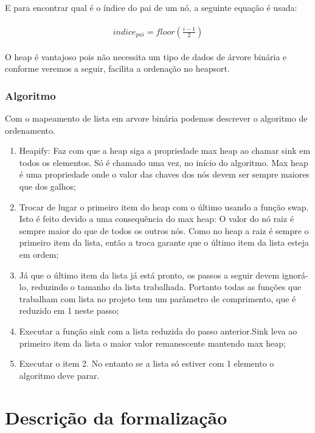 E para encontrar qual é o índice do pai de um nó, a seguinte equação é usada:

\begin{gather}
\begin{align}
indice_{pai} = floor(\frac{i-1}{2})
\end{align}
\end{gather}

O heap é vantajoso pois não necessita um tipo de dados de árvore binária e conforme veremos a seguir, facilita a ordenação no heapsort.
    
\subsection{Algoritmo}

Com o mapeamento de lista em arvore binária podemos descrever o algoritmo de ordenamento.

\begin{enumerate}
    \item Heapify: Faz com que a heap siga a propriedade max heap ao chamar sink em todos os elementos. Só é chamado uma vez, no início do algoritmo. Max heap é uma propriedade onde o valor das chaves dos nós devem ser sempre maiores que dos galhos;
    \item Trocar de lugar o primeiro item do heap com o último usando a função swap. Isto é feito devido a uma consequência do max heap: O valor do nó raiz é sempre maior do que de todos os outros nós. Como no heap a raiz é sempre o primeiro item da lista, então a troca garante que o último item da lista esteja em ordem;
    \item Já que o último item da lista já está pronto, os passos a seguir devem ignorá-lo, reduzindo o tamanho da lista trabalhada. Portanto todas as funções que trabalham com lista no projeto tem um parâmetro de comprimento, que é reduzido em 1 neste passo;
    \item Executar a função sink com a lista reduzida do passo anterior.Sink leva ao primeiro item da lista o maior valor remanescente  mantendo max heap;
    \item Executar o item 2. No entanto se a lista só estiver com 1 elemento o algoritmo deve parar.
\end{enumerate}


\chapter{Descrição da formalização}

